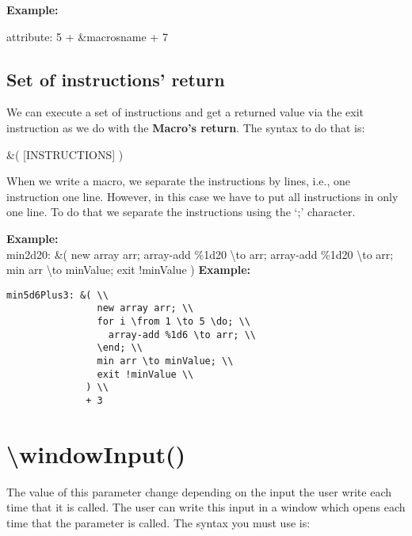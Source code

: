 \documentclass[11pt,a4paper,openright,oneside]{book}
\newenvironment{ex}
{
  \setlength{\parindent}{0cm}
  \large \textbf{Example:} \normalsize 
}
{}
\begin{document}
  \begin{ex}
  \textsf{attribute: 5 + \&macrosname + 7}
  \end{ex}

\subsection{Set of instructions' return}
  We can execute a set of instructions and get a returned value via the \textsf{exit} instruction as we do with the \textbf{Macro's return}. The syntax to do that is:
\begin{center}  \textsf{\&( \textsc{\scriptsize[INSTRUCTIONS]} )} \end{center}

  When we write a macro, we separate the instructions by lines, i.e., one instruction one line. However, in this case we have to put all instructions in only one line. To do that we separate the instructions using the `\textsf{;}' character.

\begin{ex} \\ 
  \scriptsize
  \textsf{min2d20: \&( new array arr; array-add \%1d20 \textbackslash to arr; array-add \%1d20 \textbackslash to arr; min arr \textbackslash to minValue; exit !minValue )}
  \normalsize
\end{ex} 
\begin{ex}
  \begin{lstlisting}
min5d6Plus3: &( \\  
                new array arr; \\
                for i \from 1 \to 5 \do; \\
                  array-add %1d6 \to arr; \\
                \end; \\
                min arr \to minValue; \\
                exit !minValue \\
              ) \\
              + 3
  \end{lstlisting}
\end{ex}

\section{\textsf{\textbackslash windowInput()}}

The value of this parameter change depending on the input the user write each time that it is called. The user can write this input in a window which opens each time that the parameter is called. The syntax you must use is:
\end{document}
